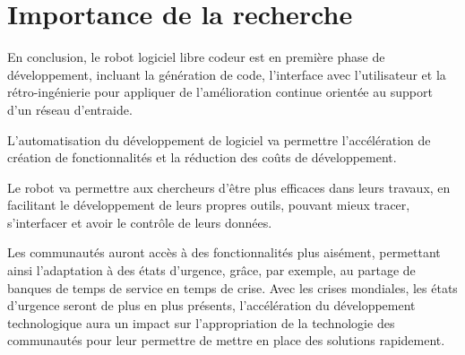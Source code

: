 






\section{Importance de la recherche}
En conclusion, le robot logiciel libre codeur est en première phase de développement, incluant la génération de code, l'interface avec l'utilisateur et la rétro-ingénierie pour appliquer de l'amélioration continue orientée au support d'un réseau d'entraide. 

L’automatisation du développement de logiciel va permettre l’accélération de création de fonctionnalités et la réduction des coûts de développement. 

Le robot va permettre aux chercheurs d’être plus efficaces dans leurs travaux, en facilitant le développement de leurs propres outils, pouvant mieux tracer, s’interfacer et avoir le contrôle de leurs données.

Les communautés auront accès à des fonctionnalités plus aisément, permettant ainsi l'adaptation à des états d'urgence, grâce, par exemple, au partage de banques de temps de service en temps de crise. 
Avec les crises mondiales, les états d’urgence seront de plus en plus présents, l’accélération du développement technologique aura un impact sur l’appropriation de la technologie des communautés pour leur permettre de mettre en place des solutions rapidement.